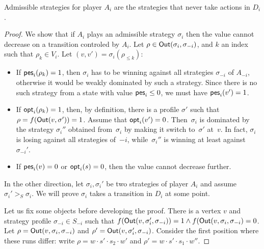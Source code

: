 \begin{theorem}
  \label{13-thm:adm}
Admissible
strategies for player \(A_i\) are the strategies that never take actions
in \(D_i\).
\end{theorem}
\begin{proof} We show that if \(A_i\) plays an admissible strategy
\(\sigma_i\) then the value cannot decrease on a transition controled by
\(A_i\). Let \(\rho \in \textsf{Out}(\sigma_i,\sigma_{-i})\), and \(k\) an index
such that \(\rho_k \in V_i\). Let \((v, v') = \sigma_i(\rho_{\le k})\):

\begin{itemize}

\item   If \(\textsf{pes}_i(\rho_k)=1\), then \(\sigma_i\) has to be winning against
  all strategies \(\sigma_{-i}\) of \(A_{-i}\), otherwise it would be
  weakly dominated by such a strategy. Since there is no such strategy
  from a state with value \(\textsf{pes}_i \leq 0\), we must have \(\textsf{pes}_i(v')=1\).
\item   If \(\textsf{opt}_i(\rho_k) = 1\), then, by definition, there is a profile \(\sigma'\) such that
  \(\rho = f(\textsf{Out}(v, \sigma')) = 1\).
  Assume that $\textsf{opt}_i(v')=0$. Then~$\sigma_i$ is dominated by the strategy
  $\sigma_i''$ obtained from~$\sigma_i$ by making it switch to~$\sigma'$ at~$v$.
  In fact, $\sigma_i$ is losing against all strategies of~$-i$, while~$\sigma_i''$
  is winning at least against~$\sigma_{-i}'$.
\item   If $\textsf{pes}_i(v)=0$ or $\textsf{opt}_i(s) = 0$, then the value cannot decrease further.
\end{itemize}

In the other direction, let \(\sigma_i,\sigma_i'\) be two strategies of
player \(A_i\) and assume \(\sigma_i' >_S \sigma_i\). We will prove
\(\sigma_i\) takes a transition in \(D_i\) at some point.

Let us fix some objects before developing the proof. There is a vertex
\(v\) and strategy profile \(\sigma_{-i} \in S_{-i}\) such that
\(f(\textsf{Out}(v,\sigma_i',\sigma_{-i}))=1 \wedge f(\textsf{Out}(v,\sigma_i,\sigma_{-i})=0\).
Let \(\rho = \textsf{Out}(v,\sigma_i,\sigma_{-i})\) and
\(\rho' = \textsf{Out}(v,\sigma_i',\sigma_{-i})\). Consider the first position
where these runs differ: write \(\rho = w \cdot s' \cdot s_2 \cdot w'\)
and \(\rho' = w \cdot s' \cdot s_1 \cdot w''\).


\end{proof}
